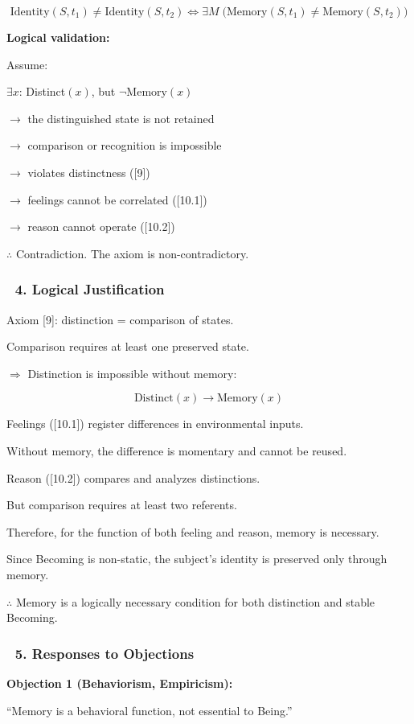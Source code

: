 \documentclass[12pt]{article}
\begin{document}
\[
\text{Identity}(S, t_1) \neq \text{Identity}(S, t_2) \Leftrightarrow \exists M\; \big(\text{Memory}(S, t_1) \neq \text{Memory}(S, t_2)\big)
\]

\textbf{Logical validation:}

Assume:

$\exists x$: Distinct$(x)$, but $\neg$Memory$(x)$

$\rightarrow$ the distinguished state is not retained

$\rightarrow$ comparison or recognition is impossible

$\rightarrow$ violates distinctness ([9])

$\rightarrow$ feelings cannot be correlated ([10.1])

$\rightarrow$ reason cannot operate ([10.2])

$\therefore$ Contradiction. The axiom is non-contradictory.

\subsubsection*{🔹 4. Logical Justification}
Axiom [9]: distinction = comparison of states.

Comparison requires at least one preserved state.

$\Rightarrow$ Distinction is impossible without memory:

\[
\text{Distinct}(x) \rightarrow \text{Memory}(x)
\]

Feelings ([10.1]) register differences in environmental inputs.

Without memory, the difference is momentary and cannot be reused.

Reason ([10.2]) compares and analyzes distinctions.

But comparison requires at least two referents.

Therefore, for the function of both feeling and reason, memory is necessary.

Since Becoming is non-static, the subject's identity is preserved only through memory.

$\therefore$ Memory is a logically necessary condition for both distinction and stable Becoming.

\subsubsection*{🔹 5. Responses to Objections}
\textbf{Objection 1 (Behaviorism, Empiricism):}

``Memory is a behavioral function, not essential to Being.''
\end{document}
